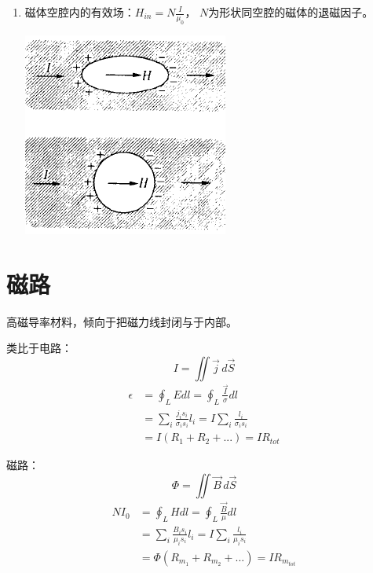\begin{enumerate}
    \item 磁体空腔内的有效场：$H_{in} = N \frac{I}{\mu_0}$，
    $N$为形状同空腔的磁体的退磁因子。
    \begin{center}
        \includegraphics[scale=0.8]{images/1_4.png}
    \end{center}
\end{enumerate}



\section{磁路}
高磁导率材料，倾向于把磁力线封闭与于内部。

类比于电路：
\[I = \iint \vec{j} \,d\vec{S}\]
\begin{align*}
    \epsilon 
    &= \oint_L Edl = \oint_L \frac{\vec{I}}{\sigma}dl\\
    &= \sum_i \frac{j_i s_i}{\sigma_i s_i} l_i
        = I \sum_i \frac{l_i}{\sigma_i s_i} \\
    &= I(R_1 + R_2 + ...) = IR_{tot}
\end{align*}

\newpage

磁路：
\[\Phi = \iint \vec{B} \,d\vec{S}\]
\begin{align*}
    NI_0 
    &= \oint_L Hdl = \oint_L \frac{\vec{B}}{\mu}dl\\
    &= \sum_i \frac{B_i s_i}{\mu_i s_i} l_i
        = I \sum_i \frac{l_i}{\mu_i s_i} \\
    &= \Phi(R_{m_1} + R_{m_2} + ...) = IR_{m_{tot}}
\end{align*}

